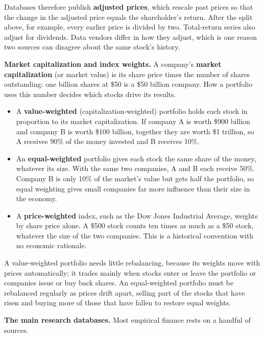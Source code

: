 Databases therefore publish \textbf{adjusted prices}, which rescale past prices so that the change in the adjusted price equals the shareholder's return. After the split above, for example, every earlier price is divided by two. Total-return series also adjust for dividends. Data vendors differ in how they adjust, which is one reason two sources can disagree about the same stock's history.

\textbf{Market capitalization and index weights.} A company's \textbf{market capitalization} (or market value) is its share price times the number of shares outstanding: one billion shares at \$50 is a \$50 billion company. How a portfolio uses this number decides which stocks drive its results.

\begin{itemize}
  \item A \textbf{value-weighted} (capitalization-weighted) portfolio holds each stock in proportion to its market capitalization. If company A is worth \$900 billion and company B is worth \$100 billion, together they are worth \$1 trillion, so A receives 90\% of the money invested and B receives 10\%.
  \item An \textbf{equal-weighted} portfolio gives each stock the same share of the money, whatever its size. With the same two companies, A and B each receive 50\%. Company B is only 10\% of the market's value but gets half the portfolio, so equal weighting gives small companies far more influence than their size in the economy.
  \item A \textbf{price-weighted} index, such as the Dow Jones Industrial Average, weights by share price alone. A \$500 stock counts ten times as much as a \$50 stock, whatever the size of the two companies. This is a historical convention with no economic rationale.
\end{itemize}

A value-weighted portfolio needs little rebalancing, because its weights move with prices automatically; it trades mainly when stocks enter or leave the portfolio or companies issue or buy back shares. An equal-weighted portfolio must be rebalanced regularly as prices drift apart, selling part of the stocks that have risen and buying more of those that have fallen to restore equal weights.


\textbf{The main research databases.} Most empirical finance rests on a handful of sources.

